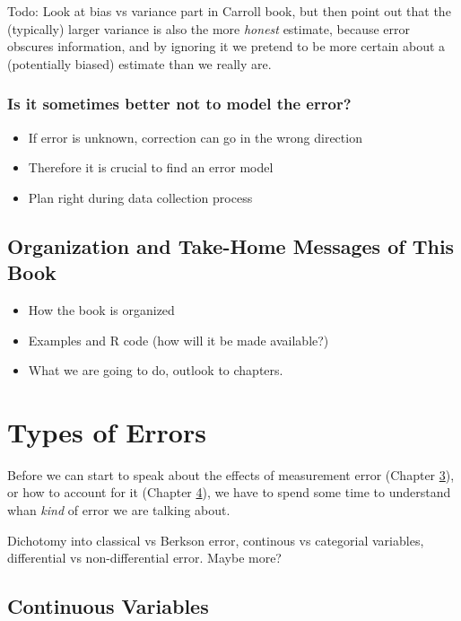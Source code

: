 \documentclass[]{book}
\providecommand{\tightlist}{%
  \setlength{\itemsep}{0pt}\setlength{\parskip}{0pt}}
\theoremstyle{definition}
\theoremstyle{definition}
\theoremstyle{definition}
\theoremstyle{remark}
\begin{document}
Todo: Look at bias vs variance part in Carroll book, but then point out
that the (typically) larger variance is also the more \emph{honest}
estimate, because error obscures information, and by ignoring it we
pretend to be more certain about a (potentially biased) estimate than we
really are.

\subsection{Is it sometimes better not to model the
error?}\label{is-it-sometimes-better-not-to-model-the-error}

\begin{itemize}
\tightlist
\item
  If error is unknown, correction can go in the wrong direction
\item
  Therefore it is crucial to find an error model
\item
  Plan right during data collection process
\end{itemize}

\section{Organization and Take-Home Messages of This
Book}\label{organization-and-take-home-messages-of-this-book}

\begin{itemize}
\tightlist
\item
  How the book is organized
\item
  Examples and R code (how will it be made available?)
\item
  What we are going to do, outlook to chapters.
\end{itemize}

\chapter{Types of Errors}\label{types-of-errors}

Before we can start to speak about the effects of measurement error
(Chapter \protect\hyperlink{effects}{3}), or how to account for it
(Chapter \protect\hyperlink{accounting}{4}), we have to spend some time
to understand whan \emph{kind} of error we are talking about.

Dichotomy into classical vs Berkson error, continous vs categorial
variables, differential vs non-differential error. Maybe more?

\section{Continuous Variables}\label{sec:errortypes}
\end{document}
